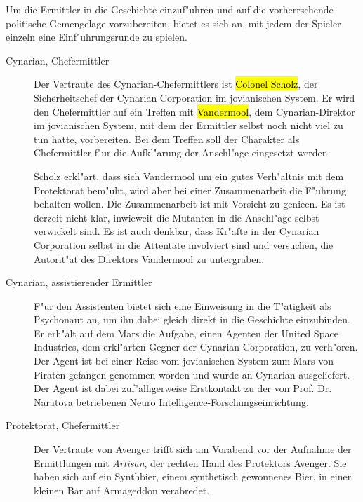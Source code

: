 
Um die Ermittler in die Geschichte einzuf"uhren und auf die vorherrschende politische Gemengelage vorzubereiten, bietet es sich an, mit jedem der Spieler einzeln eine Einf"uhrungsrunde zu spielen.

\begin{description}
\item [Cynarian, Chefermittler] Der Vertraute des Cynarian-Chefermittlers ist \hl{Colonel Scholz}, der Sicherheitschef der Cynarian 	
		Corporation im jovianischen System. Er wird den Chefermittler auf ein Treffen mit \hl{Vandermool}, dem Cynarian-Direktor im jovianischen System, mit dem der Ermittler selbst noch nicht viel zu tun hatte, vorbereiten. Bei dem Treffen soll der Charakter als Chefermittler f"ur die Aufkl"arung der Anschl"age eingesetzt werden. 
		
		Scholz erkl"art, dass sich Vandermool um ein gutes Verh"altnis mit dem Protektorat bem"uht, wird aber bei einer Zusammenarbeit die F"uhrung behalten wollen. Die Zusammenarbeit ist mit Vorsicht zu genie\3en. Es ist derzeit nicht klar, inwieweit die Mutanten in die Anschl"age selbst verwickelt sind. Es ist auch denkbar, dass Kr"afte in der Cynarian Corporation selbst in die Attentate involviert sind und versuchen, die Autorit"at des Direktors Vandermool zu untergraben.
	\item [Cynarian, assistierender Ermittler] F"ur den Assistenten bietet sich eine Einweisung in die T"atigkeit als Psychonaut an, um ihn 
		dabei gleich direkt in die Geschichte einzubinden. Er erh"alt auf dem Mars die Aufgabe, einen Agenten der United Space Industries, dem erkl"arten Gegner der Cynarian Corporation, zu verh"oren. Der Agent ist bei einer Reise vom jovianischen System zum Mars von Piraten gefangen genommen worden und wurde an Cynarian ausgeliefert. Der Agent ist dabei zuf"alligerweise Erstkontakt zu der von Prof. Dr. Naratova betriebenen Neuro Intelligence-Forschungseinrichtung.
	\item [Protektorat, Chefermittler] Der Vertraute von Avenger trifft sich am Vorabend vor der Aufnahme der Ermittlungen mit 
		\emph{Artisan}, der rechten Hand des Protektors Avenger. Sie haben sich auf ein Synthbier, einem synthetisch gewonnenes Bier, in einer kleinen Bar auf Armageddon verabredet. 
		

\end{description}
